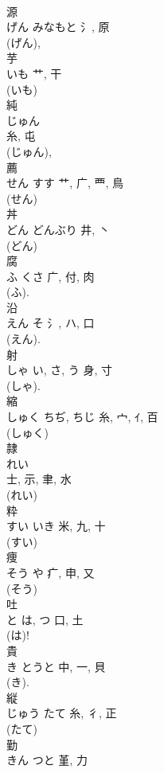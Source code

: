 \documentclass[8pt]{extreport}
\begin{document}
\begin{CJK}{UTF8}{min}
\\	源	
\\	げん	みなもと	氵, 原	
\\	(げん), 
\\	芋	
\\	いも	艹, 干	
\\	(いも) 
\\	純	
\\	じゅん	
\\	糸, 屯	
\\	(じゅん), 
\\	薦	
\\	せん	すす	艹, 广, 覀, 鳥	
\\	(せん) 
\\	丼	
\\	どん	どんぶり	井, 丶	
\\	(どん) 
\\	腐	
\\	ふ	くさ	广, 付, 肉	
\\	(ふ). 
\\	沿	
\\	えん	そ	氵, ハ, 口	
\\	(えん).	
\\	射	
\\	しゃ	い, さ, う	身, 寸	
\\	(しゃ). 
\\	縮	
\\	しゅく	ちぢ, ちじ	糸, 宀, ｲ, 百	
\\	(しゅく) 
\\	隷	
\\	れい	
\\	士, 示, 聿, 水	
\\	(れい) 
\\	粋	
\\	すい	いき	米, 九, 十	
\\	(すい) 
\\	痩	
\\	そう	や	疒, 申, 又	
\\	(そう) 
\\	吐	
\\	と	は, つ	口, 土	
\\	(は)!
\\	貴	
\\	き	とうと	中, 一, 貝	
\\	(き). 
\\	縦	
\\	じゅう	たて	糸, 彳, 正		
\\	(たて) 
\\	勤	
\\	きん	つと	堇, 力	

\end{CJK}
\end{document}
